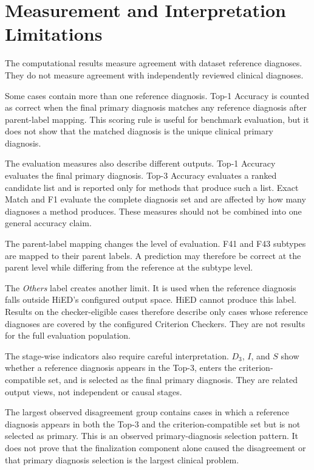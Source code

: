 \documentclass[12pt,a4paper,oneside]{report}
\begin{document}
\section{Measurement and Interpretation Limitations}

The computational results measure agreement with dataset reference
diagnoses. They do not measure agreement with independently reviewed
clinical diagnoses.

Some cases contain more than one reference diagnosis. Top-1 Accuracy is
counted as correct when the final primary diagnosis matches any
reference diagnosis after parent-label mapping. This scoring rule is
useful for benchmark evaluation, but it does not show that the matched
diagnosis is the unique clinical primary diagnosis.

The evaluation measures also describe different outputs. Top-1
Accuracy evaluates the final primary diagnosis. Top-3 Accuracy evaluates
a ranked candidate list and is reported only for methods that produce
such a list. Exact Match and F1 evaluate the complete diagnosis set and
are affected by how many diagnoses a method produces. These measures
should not be combined into one general accuracy claim.

The parent-label mapping changes the level of evaluation. F41 and F43
subtypes are mapped to their parent labels. A prediction may therefore
be correct at the parent level while differing from the reference at the
subtype level.

The \emph{Others} label creates another limit. It is used when the
reference diagnosis falls outside HiED's configured output space. HiED
cannot produce this label. Results on the checker-eligible cases
therefore describe only cases whose reference diagnoses are covered by
the configured Criterion Checkers. They are not results for the full
evaluation population.

The stage-wise indicators also require careful interpretation.
$D_3$, $I$, and $S$ show whether a reference diagnosis appears in the
Top-3, enters the criterion-compatible set, and is selected as the final
primary diagnosis. They are related output views, not independent or
causal stages.

The largest observed disagreement group contains cases in which a
reference diagnosis appears in both the Top-3 and the
criterion-compatible set but is not selected as primary. This is an
observed primary-diagnosis selection pattern. It does not prove that the
finalization component alone caused the disagreement or that primary
diagnosis selection is the largest clinical problem.
\end{document}
